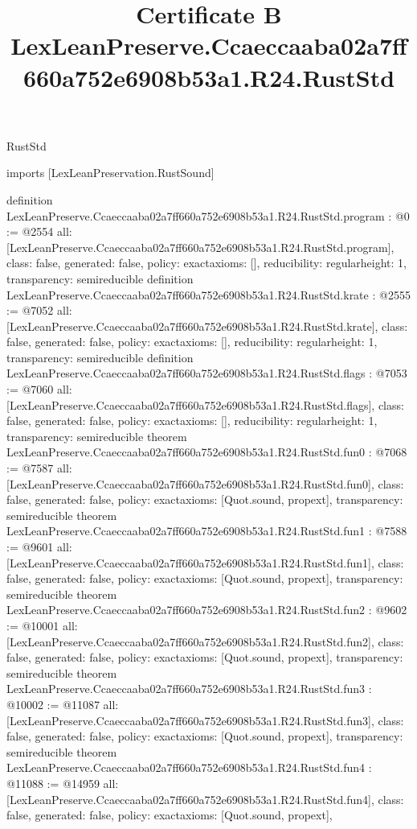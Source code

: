 \begin{lexlean}{RustStd}
\title{Certificate B LexLeanPreserve.Ccaeccaaba02a7ff660a752e6908b53a1.R24.RustStd}
\begin{coremodule}
imports [LexLeanPreservation.RustSound]

definition LexLeanPreserve.Ccaeccaaba02a7ff660a752e6908b53a1.R24.RustStd.program : @0 := @2554 {
  all: [LexLeanPreserve.Ccaeccaaba02a7ff660a752e6908b53a1.R24.RustStd.program],
  class: false,
  generated: false,
  policy: exact{axioms: []},
  reducibility: regular{height: 1},
  transparency: semireducible
}
definition LexLeanPreserve.Ccaeccaaba02a7ff660a752e6908b53a1.R24.RustStd.krate : @2555 := @7052 {
  all: [LexLeanPreserve.Ccaeccaaba02a7ff660a752e6908b53a1.R24.RustStd.krate],
  class: false,
  generated: false,
  policy: exact{axioms: []},
  reducibility: regular{height: 1},
  transparency: semireducible
}
definition LexLeanPreserve.Ccaeccaaba02a7ff660a752e6908b53a1.R24.RustStd.flags : @7053 := @7060 {
  all: [LexLeanPreserve.Ccaeccaaba02a7ff660a752e6908b53a1.R24.RustStd.flags],
  class: false,
  generated: false,
  policy: exact{axioms: []},
  reducibility: regular{height: 1},
  transparency: semireducible
}
theorem LexLeanPreserve.Ccaeccaaba02a7ff660a752e6908b53a1.R24.RustStd.fun0 : @7068 := @7587 {
  all: [LexLeanPreserve.Ccaeccaaba02a7ff660a752e6908b53a1.R24.RustStd.fun0],
  class: false,
  generated: false,
  policy: exact{axioms: [Quot.sound, propext]},
  transparency: semireducible
}
theorem LexLeanPreserve.Ccaeccaaba02a7ff660a752e6908b53a1.R24.RustStd.fun1 : @7588 := @9601 {
  all: [LexLeanPreserve.Ccaeccaaba02a7ff660a752e6908b53a1.R24.RustStd.fun1],
  class: false,
  generated: false,
  policy: exact{axioms: [Quot.sound, propext]},
  transparency: semireducible
}
theorem LexLeanPreserve.Ccaeccaaba02a7ff660a752e6908b53a1.R24.RustStd.fun2 : @9602 := @10001 {
  all: [LexLeanPreserve.Ccaeccaaba02a7ff660a752e6908b53a1.R24.RustStd.fun2],
  class: false,
  generated: false,
  policy: exact{axioms: [Quot.sound, propext]},
  transparency: semireducible
}
theorem LexLeanPreserve.Ccaeccaaba02a7ff660a752e6908b53a1.R24.RustStd.fun3 : @10002 := @11087 {
  all: [LexLeanPreserve.Ccaeccaaba02a7ff660a752e6908b53a1.R24.RustStd.fun3],
  class: false,
  generated: false,
  policy: exact{axioms: [Quot.sound, propext]},
  transparency: semireducible
}
theorem LexLeanPreserve.Ccaeccaaba02a7ff660a752e6908b53a1.R24.RustStd.fun4 : @11088 := @14959 {
  all: [LexLeanPreserve.Ccaeccaaba02a7ff660a752e6908b53a1.R24.RustStd.fun4],
  class: false,
  generated: false,
  policy: exact{axioms: [Quot.sound, propext]},
}
\end{coremodule}
\end{lexlean}
